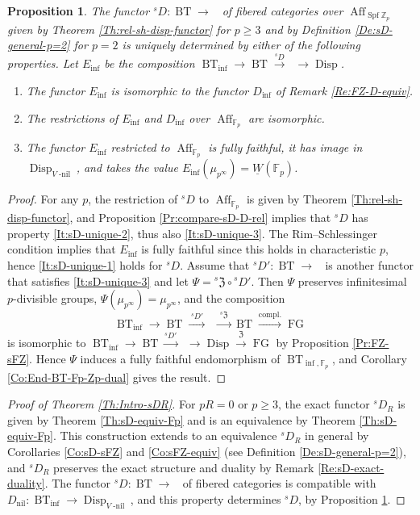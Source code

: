 \documentclass[a4paper,11pt]{amsart}
\theoremstyle{plain}
\newtheorem{Prop}[equation]{Proposition}
\theoremstyle{definition}
\theoremstyle{remark}
\newcommand{\bPr}{\begin{Prop}}
\newcommand{\ePr}{\end{Prop}}
\newcommand{\bproof}{\begin{proof}}
\newcommand{\eproof}{\end{proof}}
\renewcommand{\u}{\underline}
\numberwithin{equation}{section}
\newcommand{\FZ}{\mathfrak{Z}}
\newcommand{\FF}{{\mathbb{F}}}
\newcommand{\ZZ}{{\mathbb{Z}}}
\DeclareMathOperator{\nil}{nil}
\DeclareMathOperator{\nnil}{-nil}
\DeclareMathOperator{\Aff}{Aff}
\DeclareMathOperator{\BT}{BT}
\DeclareMathOperator{\Disp}{Disp}
\DeclareMathOperator{\sDisp}{{}^sDisp}
\DeclareMathOperator{\FG}{FG}
\DeclareMathOperator{\Spf}{Spf}
\newcommand{\Vnil}{V{\nnil}}
\newcommand{\sD}{{}^{s\!}D}
\newcommand{\sFZ}{{}^s\FZ}
\begin{document}
\bPr
\label{Pr:sD-unique}
The functor $\sD\colon \BT\to\sDisp$ of fibered categories over $\Aff_{\Spf\ZZ_p}$ given by Theorem \ref{Th:rel-sh-disp-functor} for $p\ge 3$ and by Definition \ref{De:sD-general-p=2} for $p=2$ is uniquely determined by either of the following properties. Let $E_{\inf}$ be the composition $\BT_{\inf}\to\BT\xrightarrow{\sD}\sDisp\to\Disp$.
\begin{enumerate}
\item
\label{It:sD-unique-1}
The functor $E_{\inf}$ is isomorphic to the functor $D_{\inf}$ of Remark \ref{Re:FZ-D-equiv}.
\item
\label{It:sD-unique-2}
The restrictions of $E_{\inf}$ and $D_{\inf}$ over $\Aff_{\FF_p}$ are isomorphic.
\item
\label{It:sD-unique-3}
The functor $E_{\inf}$ restricted to $\Aff_{\FF_p}$ is fully faithful, it has image in $\Disp_{\Vnil}$, and takes the value $E_{\inf}(\mu_{p^\infty})=\u W(\FF_p)$.
\end{enumerate}
\ePr

\bproof
For any $p$, the restriction of $\sD$ to $\Aff_{\FF_p}$ is given by Theorem \ref{Th:rel-sh-disp-functor}, and Proposition \ref{Pr:compare-sD-D-rel} implies that $\sD$ has property \eqref{It:sD-unique-2}, thus also \eqref{It:sD-unique-3}. The Rim--Schlessinger condition implies that $E_{\inf}$ is fully faithful since this holds in characteristic $p$, hence \eqref{It:sD-unique-1} holds for $\sD$. Assume that $\sD'\colon \BT\to\sDisp$ is another functor that satisfies \eqref{It:sD-unique-3} and let $\Psi=\sFZ\circ\sD'$. Then $\Psi$ preserves infinitesimal $p$-divisible groups, $\Psi(\mu_{p^\infty})=\mu_{p^\infty}$, and the composition
\[
\BT_{\inf}\longrightarrow\BT\xrightarrow{\;\sD'\;}\sDisp\xrightarrow{\;\sFZ\;}\BT\xrightarrow {\text{compl.}}\FG
\]
is isomorphic to $\BT_{\inf}\to\BT\xrightarrow{\sD'}\sDisp\to\Disp\xrightarrow{\FZ}\FG$ by Proposition \ref{Pr:FZ-sFZ}. Hence $\Psi$ induces a fully faithful endomorphism of $\BT_{\inf,\FF_p}$, and Corollary \ref{Co:End-BT-Fp-Zp-dual} gives the result.
\eproof

\bproof[Proof of Theorem \ref{Th:Intro-sDR}]
For $pR=0$ or $p\ge 3$, the exact functor $\sD_R$ is given by Theorem \ref{Th:sD-equiv-Fp} and is an equivalence by Theorem \ref{Th:sD-equiv-Fp}. This construction extends to an equivalence $\sD_R$ in general by Corollaries \ref{Co:sD-sFZ} and \ref{Co:sFZ-equiv} (see Definition \ref{De:sD-general-p=2}), and $\sD_R$ preserves the exact structure and duality by Remark \ref{Re:sD-exact-duality}. The functor $\sD\colon\BT\to\sDisp$ of fibered categories is compatible with $D_{\nil}\colon\BT_{\inf}\to\Disp_{\Vnil}$, and this property determines $\sD$, by Proposition  \ref{Pr:sD-unique}.
\eproof
\end{document}
